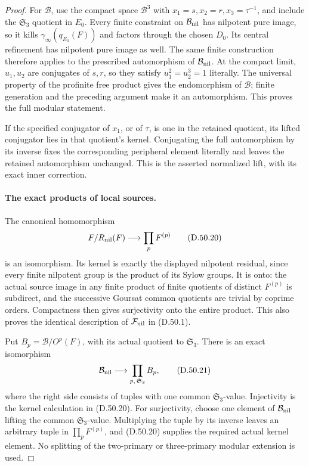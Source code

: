 \begin{proof}
For \(\mathcal B\), use the compact space \(\mathcal B^3\)
with \(x_1=s,x_2=r,x_3=\tau^{-1}\), and include the
\(\mathfrak S_3\) quotient in \(E_0\).
Every finite constraint on \(\mathcal B_{\rm nil}\)
has nilpotent pure image, so it kills
\(\gamma_\infty(q_{E_0}(F))\) and factors through the
chosen \(D_0\). Its central refinement has nilpotent
pure image as well. The same finite construction
therefore applies to the prescribed automorphism of
\(\mathcal B_{\rm nil}\).
At the compact limit, \(u_1,u_2\) are conjugates of
\(s,r\), so they satisfy \(u_1^2=u_2^3=1\) literally.
The universal property of the profinite free product
gives the endomorphism of \(\mathcal B\); finite
generation and the preceding argument make it an
automorphism. This proves the full modular statement.

If the specified conjugator of \(x_1\), or of \(\tau\),
is one in the retained quotient, its lifted conjugator
lies in that quotient's kernel. Conjugating the full
automorphism by its inverse fixes the corresponding
peripheral element literally and leaves the retained
automorphism unchanged. This is the asserted normalized
lift, with its exact inner correction.

\paragraph{The exact products of local sources.}
The canonical homomorphism
\[
            F/R_{\rm nil}(F)\longrightarrow\prod_p F^{(p)}
 \tag{D.50.20}
\]
is an isomorphism. Its kernel is exactly the displayed
nilpotent residual, since every finite nilpotent group
is the product of its Sylow groups. It is onto: the
actual source image in any finite product of finite
quotients of distinct \(F^{(p)}\) is subdirect, and
the successive Goursat common quotients are trivial
by coprime orders. Compactness then gives surjectivity
onto the entire product. This also proves the identical
description of \(\mathcal F_{\rm nil}\) in
\textup{(D.50.1)}.

Put \(B_p=\mathcal B/O^p(F)\), with its actual quotient
to \(\mathfrak S_3\). There is an exact isomorphism
\[
 \mathcal B_{\rm nil}
       \longrightarrow\mathop{\prod}_{p,\,\mathfrak S_3}B_p,
 \tag{D.50.21}
\]
where the right side consists of tuples with one common
\(\mathfrak S_3\)-value.
Injectivity is the kernel calculation in
\textup{(D.50.20)}. For surjectivity, choose one element
of \(\mathcal B_{\rm nil}\) lifting the common
\(\mathfrak S_3\)-value. Multiplying the tuple by its
inverse leaves an arbitrary tuple in \(\prod_pF^{(p)}\),
and \textup{(D.50.20)} supplies the required actual
kernel element. No splitting of the two-primary or
three-primary modular extension is used.


\end{proof}
